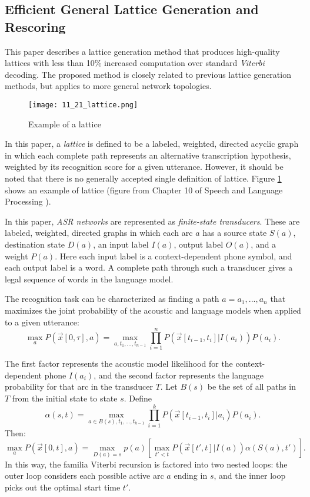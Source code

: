 \subsection{Efficient General Lattice Generation and Rescoring \cite{Ljolje1999}}

This paper describes a lattice generation method that produces high-quality lattices with less than 10\% increased computation over standard \emph{Viterbi} decoding. The proposed method is closely related to previous lattice generation methods, but applies to more general network topologies.

\begin{figure}[h]
  \centering
  \texttt{[image: 11\_21\_lattice.png]}\\
  \caption{Example of a lattice}\label{fig:lattice}
\end{figure}

In this paper, a \emph{lattice} is defined to be a labeled, weighted, directed acyclic graph in which each complete path represents an alternative transcription hypothesis, weighted by its recognition score for a given utterance. However, it should be noted that there is no generally accepted single definition of lattice. Figure \ref{fig:lattice} shows an example of lattice (figure from Chapter 10 of Speech and Language Processing \cite{Jurafsky2006}).

In this paper, \emph{ASR networks} are represented as \emph{finite-state transducers}. These are labeled, weighted, directed graphs in which each arc $a$ has a source state $S(a)$, destination state $D(a)$, an input label $I(a)$, output label $O(a)$, and a weight $P(a)$. Here each input label is a context-dependent phone symbol, and each output label is a word. A complete path through such a transducer gives a legal sequence of words in the language model.

The recognition task can be characterized as finding a path $a = a_1,...,a_n$ that maximizes the joint probability of the acoustic and language models when applied to a given utterance:
$$\max_a P(\vec{x}[0, \tau], a) = \max_{a, t_1, ..., t_{n-1}}\prod_{i=1}^n P(\vec{x}[t_{i-1}, t_i] | I(a_i)) P(a_i).$$

The first factor represents the acoustic model likelihood for the context-dependent phone $I(a_i)$, and the second factor represents the language probability for that arc in the transducer $T$. Let $B(s)$ be the set of all paths in $T$ from the initial state to state $s$. Define
$$\alpha(s,t) = \max_{a \in B(s), t_1, ..., t_{k-1}} \prod_{i=1}^k P(\vec{x}[t_{i-1}, t_i] | a_i) P(a_i).$$
Then:
$$\max_{a} P(\vec{x}[0,t], a) = \max_{D(a)=s} p(a) [\max_{t' < t} P(\vec{x}[t',t]|I(a)) \alpha(S(a), t')].$$
In this way, the familia Viterbi recursion is factored into two nested loops: the outer loop considers each possible active arc $a$ ending in $s$, and the inner loop picks out the optimal start time $t'$.

